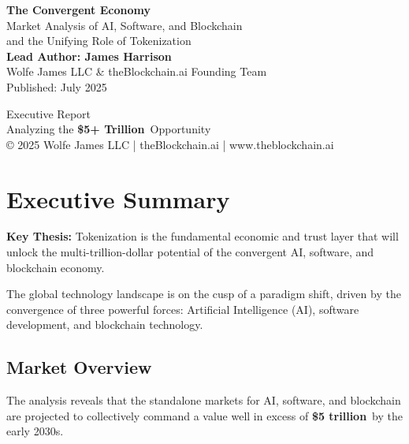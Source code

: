 \documentclass[11pt,a4paper]{report}
\newcommand{\marketvalue}[2]{\textcolor{accentgreen}{\textbf{\$#1}}\,\textcolor{darkgray}{#2}}
\begin{document}
\begin{titlepage}
    \centering
    \vspace*{2cm}
    {\Huge\bfseries The Convergent Economy}\\[1cm]
    {\Large Market Analysis of AI, Software, and Blockchain\\and the Unifying Role of Tokenization}\\[2cm]
    
    {\large\bfseries Lead Author: James Harrison}\\[0.2cm]
    {\normalsize Wolfe James LLC \& theBlockchain.ai Founding Team}\\[0.5cm]
    {\normalsize Published: July 2025}\\[1cm]
    
    \vfill
    
    {\large Executive Report\\Analyzing the \marketvalue{5+ Trillion}{} Opportunity}\\[1cm]
    
    {\small © 2025 Wolfe James LLC | theBlockchain.ai | www.theblockchain.ai}
\end{titlepage}

\tableofcontents

\chapter*{Executive Summary}

\textbf{Key Thesis:} Tokenization is the fundamental economic and trust layer that will unlock the multi-trillion-dollar potential of the convergent AI, software, and blockchain economy.

The global technology landscape is on the cusp of a paradigm shift, driven by the convergence of three powerful forces: Artificial Intelligence (AI), software development, and blockchain technology.

\section*{Market Overview}

The analysis reveals that the standalone markets for AI, software, and blockchain are projected to collectively command a value well in excess of \marketvalue{5 trillion}{} by the early 2030s.
\end{document}

